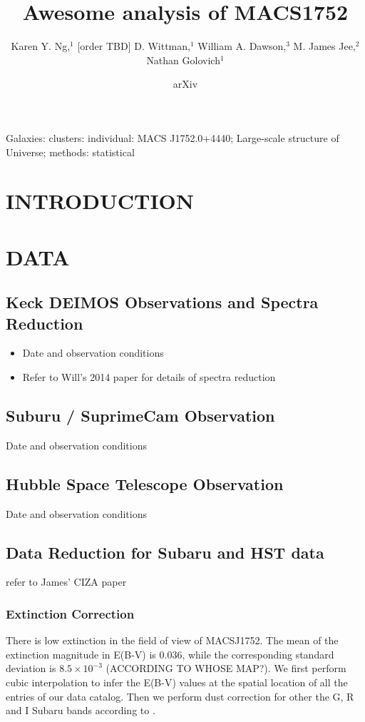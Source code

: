 \documentclass[letterpaper,useAMS,usenatbib]{mn2e}
\title[
	Awesome analysis of MACS1752 
]
{Awesome analysis of MACS1752}
\author[Karen Y. Ng et al.]{Karen Y. Ng,$^{1}$
	[order TBD]
	D. Wittman,$^{1}$
	William A. Dawson,$^{3}$ 
	M. James Jee,$^{2}$
	\newauthor Nathan Golovich$^{1}$
}
\begin{document}
\date{arXiv} \pagerange{\pageref{firstpage}--\pageref{lastpage}}
 \maketitle\label{firstpage}
\begin{abstract} 
	
\end{abstract}
\begin{keywords}
Galaxies: clusters: individual: MACS J1752.0+4440; Large-scale structure of
Universe; methods: statistical 
\end{keywords}
\section{INTRODUCTION} 
\section{DATA}
\subsection{Keck DEIMOS Observations and Spectra Reduction}
\begin{itemize}
	\item Date and observation conditions
	\item Refer to Will's 2014 paper for details of spectra reduction 
\end{itemize}

\subsection{Suburu / SuprimeCam Observation}
Date and observation conditions

\subsection{Hubble Space Telescope Observation} 
Date and observation conditions

\subsection{Data Reduction for Subaru and HST data}
refer to James' CIZA paper

\subsubsection{Extinction Correction}
There is low extinction in the field of view of MACSJ1752. The mean of the extinction
magnitude in E(B-V) is 0.036, while the corresponding standard deviation 
is $8.5 \times 10^{-3}$ (ACCORDING TO WHOSE MAP?).
We first perform cubic interpolation to infer the E(B-V) values at the spatial
location of all the entries of our data catalog. Then we perform dust
correction for other the G, R and I Subaru bands according to \cite{Schlafly2010}.
\end{document}
